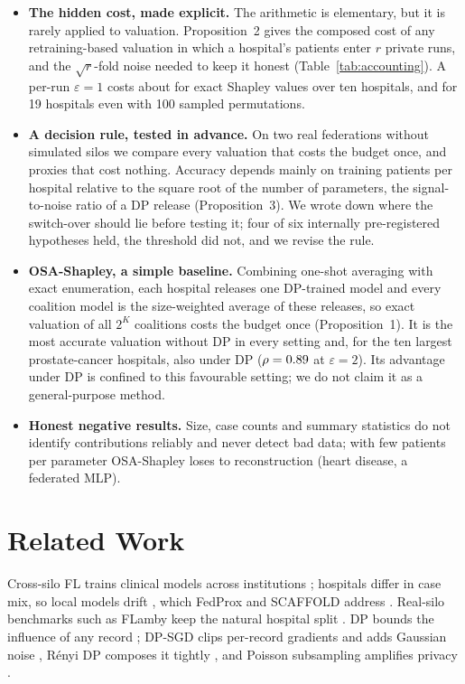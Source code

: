 \documentclass[journal]{IEEEtran}
\begin{document}
\begin{itemize}
    \item \textbf{The hidden cost, made explicit.} The arithmetic is elementary, but it is rarely applied to valuation. Proposition~2 gives the composed cost of any retraining-based valuation in which a hospital's patients enter $r$ private runs, and the $\sqrt r$-fold noise needed to keep it honest (Table~\ref{tab:accounting}). A per-run $\varepsilon=1$ costs about \trueEpsOne{} for exact Shapley values over ten hospitals, and \accMcNineteenOne{} for 19 hospitals even with 100 sampled permutations.
    \item \textbf{A decision rule, tested in advance.} On two real federations without simulated silos we compare every valuation that costs the budget once, and proxies that cost nothing. Accuracy depends mainly on training patients per hospital relative to the square root of the number of parameters, the signal-to-noise ratio of a DP release (Proposition~3). We wrote down where the switch-over should lie before testing it; four of six internally pre-registered hypotheses held, the threshold did not, and we revise the rule.
    \item \textbf{OSA-Shapley, a simple baseline.} Combining one-shot averaging \cite{Zhang2013AVGM} with exact enumeration, each hospital releases one DP-trained model and every coalition model is the size-weighted average of these releases, so exact valuation of all $2^K$ coalitions costs the budget once (Proposition~1). It is the most accurate valuation without DP in every setting and, for the ten largest prostate-cancer hospitals, also under DP ($\rho=0.89$ at $\varepsilon=2$). Its advantage under DP is confined to this favourable setting; we do not claim it as a general-purpose method.
    \item \textbf{Honest negative results.} Size, case counts and summary statistics do not identify contributions reliably and never detect bad data; with few patients per parameter OSA-Shapley loses to reconstruction (heart disease, a federated MLP).
\end{itemize}

\section{Related Work}
\label{sec:related}
Cross-silo FL trains clinical models across institutions \cite{Rieke2020DigitalHealth, Sheller2020MedicineFL, Li2021SurveyFLMedical}; hospitals differ in case mix, so local models drift \cite{Kairouz2021FLAdvances, Zhao2018NonIID}, which FedProx and SCAFFOLD address \cite{Li2020FedProx, Karimireddy2020Scaffold}. Real-silo benchmarks such as FLamby keep the natural hospital split \cite{Terrail2022FLamby}. DP bounds the influence of any record \cite{Dwork2006CalibratingNoise, Dwork2008DPSurvey}; DP-SGD clips per-record gradients and adds Gaussian noise \cite{Abadi2016DPSGD}, R\'enyi DP composes it tightly \cite{Mironov2017RDP}, and Poisson subsampling amplifies privacy \cite{Mironov2019SampledGaussian}.
\end{document}
